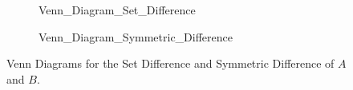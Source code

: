 \documentclass[crop=false,class=book,oneside]{standalone}
\begin{document}
            \begin{figure}[H]
                \captionsetup{type=figure}
                \centering
                \begin{subfigure}[b]{0.49\textwidth}
                    \captionsetup{type=figure}
                    \centering
                    
                              {Venn_Diagram_Set_Difference}
                    \label{fig:Elem_Alg_Set_Difference}
                \end{subfigure}
                \begin{subfigure}[b]{0.49\textwidth}
                    \captionsetup{type=figure}
                    \centering
                    
                              {Venn_Diagram_Symmetric_Difference}
                    \label{fig:Elem_Alg_Symmetric_Differece}
                \end{subfigure}
                \caption[Venn Diagrams for Various Set Operations]
                        {Venn Diagrams for the Set Difference
                         and Symmetric Difference of $A$ and $B$.}
                \label{fig:Elem_Alg_Venn_Diagram_Differences}
            \end{figure}
\end{document}
